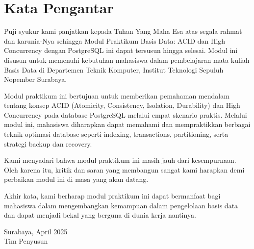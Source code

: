 \chapter*{Kata Pengantar}

Puji syukur kami panjatkan kepada Tuhan Yang Maha Esa atas segala rahmat dan karunia-Nya sehingga Modul Praktikum Basis Data: ACID dan High Concurrency dengan PostgreSQL ini dapat tersusun hingga selesai. Modul ini disusun untuk memenuhi kebutuhan mahasiswa dalam pembelajaran mata kuliah Basis Data di Departemen Teknik Komputer, Institut Teknologi Sepuluh Nopember Surabaya.

Modul praktikum ini bertujuan untuk memberikan pemahaman mendalam tentang konsep ACID (Atomicity, Consistency, Isolation, Durability) dan High Concurrency pada database PostgreSQL melalui empat skenario praktis. Melalui modul ini, mahasiswa diharapkan dapat memahami dan mempraktikkan berbagai teknik optimasi database seperti indexing, transactions, partitioning, serta strategi backup dan recovery.

Kami menyadari bahwa modul praktikum ini masih jauh dari kesempurnaan. Oleh karena itu, kritik dan saran yang membangun sangat kami harapkan demi perbaikan modul ini di masa yang akan datang.

Akhir kata, kami berharap modul praktikum ini dapat bermanfaat bagi mahasiswa dalam mengembangkan kemampuan dalam pengelolaan basis data dan dapat menjadi bekal yang berguna di dunia kerja nantinya.

\vspace{1cm}

\begin{flushright}
Surabaya, April 2025\\

Tim Penyusun
\end{flushright}